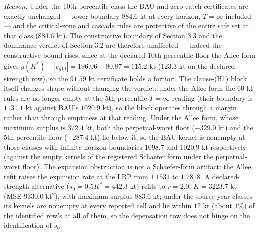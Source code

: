 \emph{Reason.} Under the 10th-percentile class the BAU and zero-catch
certificates are exactly unchanged --- lower boundary \(884.6\) kt at
every horizon, \(T=\infty\) included --- and the critical-zone and
cascade rules are protective of the entire safe set at that class
(\(884.6\) kt). The constructive boundary of Section 3.3 and the
dominance verdict of Section 3.2 are therefore unaffected --- indeed the
constructive bound rises, since at the declared 10th-percentile floor the
Allee form gives \(g(K^*) - |e_{q10}| = 196.06 - 80.87 = 115.2\) kt
(\(123.3\) kt on the declared-strength row), so the \(91.59\) kt
certificate holds a fortiori. The clause-(H1) block itself changes shape without changing the verdict:
under the Allee form the 60-kt rules are no longer empty at the
5th-percentile \(T=\infty\) reading (their boundary is \(1131.1\) kt
against BAU's \(1020.9\) kt), so the block operates through a margin
rather than through emptiness at that reading. Under the
Allee form, whose maximum surplus is \(372.4\) kt, both the
perpetual-worst floor (\(-329.0\) kt) and the 5th-percentile floor
(\(-287.4\) kt) lie below it, so the BAU kernel is nonempty at those
classes with infinite-horizon boundaries \(1098.7\) and \(1020.9\) kt
respectively (against the empty kernels of the registered Schaefer form
under the perpetual-worst floor). The expansion obstruction is not a
Schaefer-form artifact: the Allee refit raises the expansion rate at the
LRP from \(1.1531\) to \(1.7818\). A declared-strength alternative
(\(s_0 = 0.5K^* = 442.3\) kt) refits to \(r = 2.0\), \(K = 3223.7\) kt
(MSE \(9330.0\) kt\(^2\)), with maximum surplus \(883.6\) kt; under the
source-year classes its kernels are nonempty at every reported cell and
lie within \(12\) kt (about \(1\%\)) of the identified row's at all of
them, so the depensation row does not hinge on the identification of
\(s_0\).

